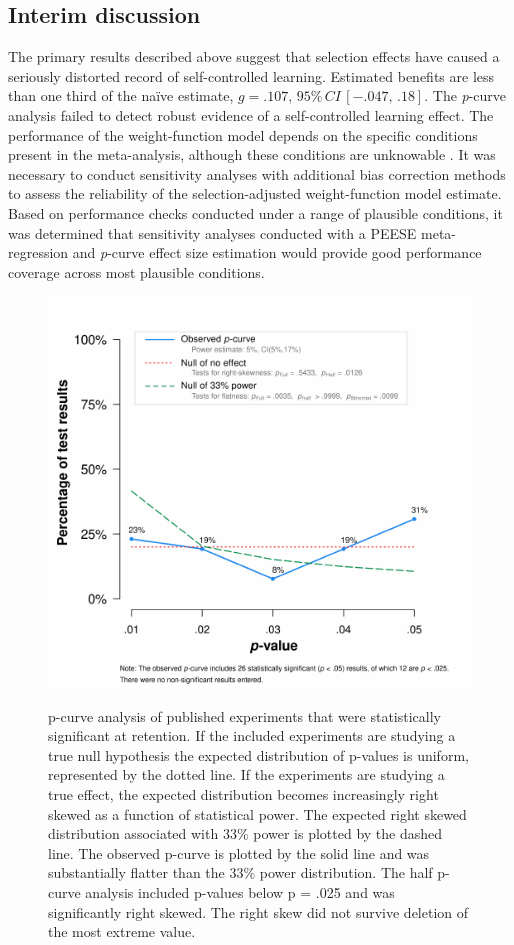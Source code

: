 \documentclass[man,floatsintext,hidelinks]{apa7}
\begin{document}
\subsection{Interim discussion}
The primary results described above suggest that selection effects have caused a seriously distorted record of self-controlled learning. Estimated benefits are less than one third of the naïve estimate, $g = .107, \,95\%\,CI \,[-.047, \,.18]$. The \emph{p}-curve analysis failed to detect robust evidence of a self-controlled learning effect. The performance of the weight-function model depends on the specific conditions present in the meta-analysis, although these conditions are unknowable \parencite{Carter2019-vv}. It was necessary to conduct sensitivity analyses with additional bias correction methods to assess the reliability of the selection-adjusted weight-function model estimate. Based on performance checks conducted under a range of plausible conditions, it was determined that sensitivity analyses conducted with a PEESE meta-regression and \emph{p}-curve effect size estimation would provide good performance coverage across most plausible conditions.

\vspace{12pt}
\begin{figure}[H]
	\caption{p-curve analysis of published experiments that were statistically significant at retention. If the included experiments are studying a true null hypothesis the expected distribution of p-values is uniform, represented by the dotted line. If the experiments are studying a true effect, the expected distribution becomes increasingly right skewed as a function of statistical power. The expected right skewed distribution associated with 33\% power is plotted by the dashed line. The observed p-curve is plotted by the solid line and was substantially flatter than the 33\% power distribution. The half p-curve analysis included p-values below p = .025 and was significantly right skewed. The right skew did not survive deletion of the most extreme value.}
	\centering
	\includegraphics[scale=1.5]{figs/fig4.pdf}
    \label{fig:Figure4}
\end{figure}
\end{document}
